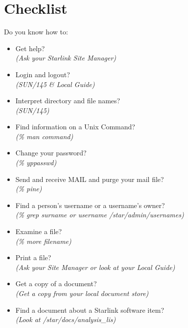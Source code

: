 \newpage

\section {Checklist}

Do you know how to:
\begin{itemize}
\item Get help?\\
\hspace*{10mm} {\em (Ask your Starlink Site Manager)}
\item Login and logout?\\
\hspace*{10mm} {\em (SUN/145 \& Local Guide)}
\item Interpret directory and file names?\\
\hspace*{10mm} {\em (SUN/145)}
\item Find information on a Unix Command?\\
\hspace*{10mm} {\em (\% man command)}
\item Change your password?\\
\hspace*{10mm} {\em (\% yppasswd)}
\item Send and receive MAIL and purge your mail file?\\
\hspace*{10mm} {\em (\% pine)}
\item Find a person's username or a username's owner?\\
\hspace*{10mm} {\em (\% grep surname or username /star/\-admin/\-usernames)}
\item Examine a file?\\
\hspace*{10mm} {\em (\% more filename)}
\item Print a file?\\
\hspace*{10mm} {\em (Ask your Site Manager or look at your Local Guide)}
\item Get a copy of a document?\\
\hspace*{10mm} {\em (Get a copy from your local document store)}
\item Find a document about a Starlink software item?\\
\hspace*{10mm} {\em (Look at /star/\-docs/\-analysis\_lis)}

\end{itemize}
